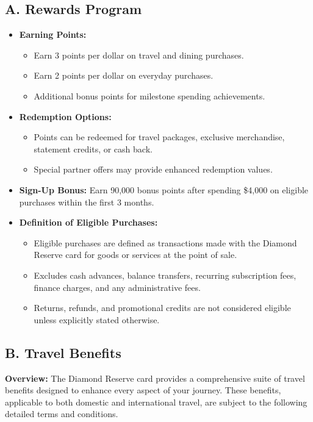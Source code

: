 \documentclass[12pt,a4paper]{article}
\begin{document}
\subsection*{A. Rewards Program}
\begin{itemize}
    \item \textbf{Earning Points:}
    \begin{itemize}
        \item Earn 3 points per dollar on travel and dining purchases.
        \item Earn 2 points per dollar on everyday purchases.
        \item Additional bonus points for milestone spending achievements.
    \end{itemize}
    \item \textbf{Redemption Options:}
    \begin{itemize}
        \item Points can be redeemed for travel packages, exclusive merchandise, statement credits, or cash back.
        \item Special partner offers may provide enhanced redemption values.
    \end{itemize}
    \item \textbf{Sign-Up Bonus:} Earn 90,000 bonus points after spending \$4,000 on eligible purchases within the first 3 months.
    \item \textbf{Definition of Eligible Purchases:}
    \begin{itemize}
        \item Eligible purchases are defined as transactions made with the Diamond Reserve card for goods or services at the point of sale.
        \item Excludes cash advances, balance transfers, recurring subscription fees, finance charges, and any administrative fees.
        \item Returns, refunds, and promotional credits are not considered eligible unless explicitly stated otherwise.
    \end{itemize}

\end{itemize}

\subsection*{B. Travel Benefits}
\textbf{Overview:} The Diamond Reserve card provides a comprehensive suite of travel benefits designed to enhance every aspect of your journey. These benefits, applicable to both domestic and international travel, are subject to the following detailed terms and conditions.
\end{document}
